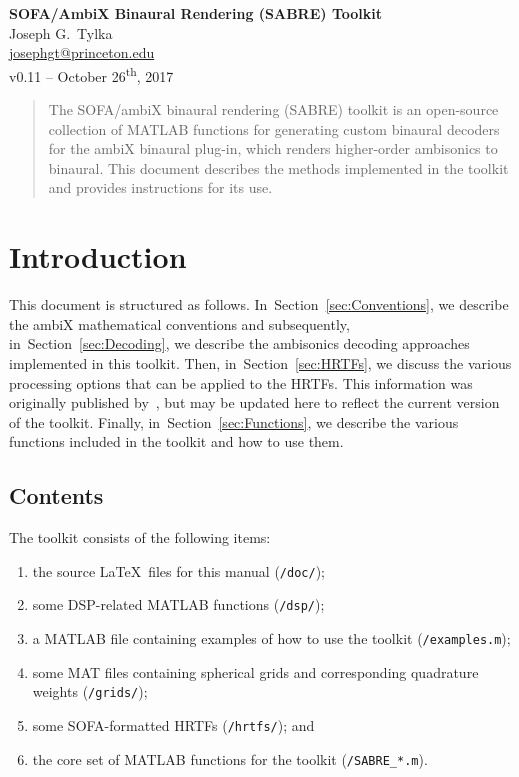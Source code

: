 \documentclass[11pt, oneside]{article}
\newcommand{\secref}[1]{Section~\ref{#1}}
\begin{document}
\begin{centering}
{\Large \textbf{SOFA/AmbiX Binaural Rendering (SABRE) Toolkit}}\\
\vspace{\baselineskip}
Joseph G.~Tylka\\
\href{mailto:josephgt@princeton.edu}{josephgt@princeton.edu}\\
\vspace{\baselineskip}
v0.11 -- October 26\textsuperscript{th}, 2017\\
\end{centering}

\begin{abstract}
The SOFA/ambiX binaural rendering (SABRE) toolkit is an open-source collection of MATLAB functions for generating custom binaural decoders for the ambiX binaural plug-in, which renders higher-order ambisonics to binaural.
This document describes the methods implemented in the toolkit and provides instructions for its use.
\end{abstract}

\section{Introduction}
This document is structured as follows.
In~\secref{sec:Conventions}, we describe the ambiX mathematical conventions and subsequently,
in~\secref{sec:Decoding}, we describe the ambisonics decoding approaches implemented in this toolkit.
Then, in~\secref{sec:HRTFs}, we discuss the various processing options that can be applied to the HRTFs.
This information was originally published by~\citet{TylkaChoueiri2017}, but may be updated here to reflect the current version of the toolkit.
Finally, in~\secref{sec:Functions}, we describe the various functions included in the toolkit and how to use them.

\subsection{Contents}
The toolkit consists of the following items:
\begin{enumerate}
\item the source \LaTeX~files for this manual (\texttt{/doc/});
\item some DSP-related MATLAB functions (\texttt{/dsp/});
\item a MATLAB file containing examples of how to use the toolkit (\texttt{/examples.m});
\item some MAT files containing spherical grids and corresponding quadrature weights (\texttt{/grids/});
\item some SOFA-formatted HRTFs (\texttt{/hrtfs/}); and
\item the core set of MATLAB functions for the toolkit (\texttt{/SABRE\_*.m}).
\end{enumerate}
\end{document}
